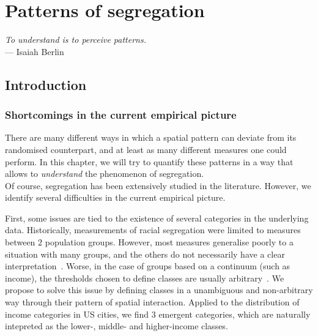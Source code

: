 %
\chapter{Patterns of segregation}
\label{chap:patterns_segregation}

\begin{flushright}{\slshape    
To understand is to perceive patterns.} \\ \medskip
--- Isaiah Berlin~\cite{Berlin:2013}
\end{flushright}


\bigskip


\section{Introduction}
\label{sec:introduction}

\subsection{Shortcomings in the current empirical picture}
\label{sub:shortcomings_in_the_current_empirical_picture}

There are many different ways in which a spatial pattern can deviate from its
randomised counterpart, and at least as many different measures one could
perform. In this chapter, we will try to quantify these patterns in a way that
allows to \emph{understand} the phenomenon of segregation.\\

Of course, segregation has been extensively studied in the literature. However,
we identify several difficulties in the current empirical picture.

First, some issues are tied to the existence of several categories in the
underlying data. Historically, measurements of racial segregation were limited
to measures between $2$ population groups. However, most measures generalise
poorly to a situation with many groups, and the others do not necessarily have a
clear interpretation~\cite{Reardon:2002}. Worse, in the case of groups based on
a continuum (such as income), the thresholds chosen to define classes are
usually arbitrary~\cite{Jargowsky:1996}. We propose to solve this issue by
defining classes in a unambiguous and non-arbitrary way through their pattern of
spatial interaction. Applied to the distribution of income categories in US
cities, we find $3$ emergent categories, which are naturally intepreted as the
lower-, middle- and higher-income classes.\\


